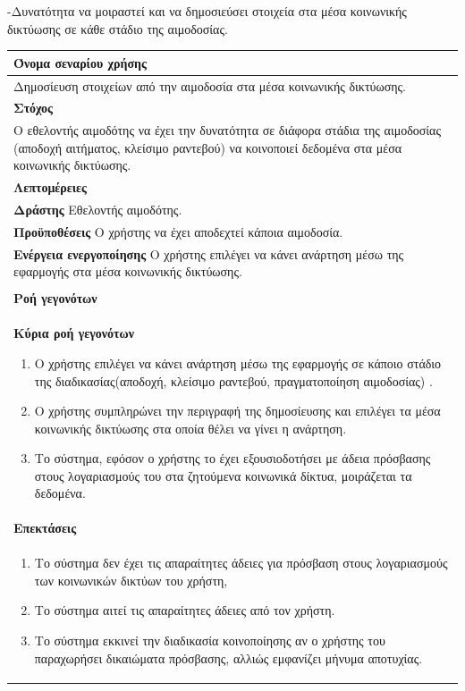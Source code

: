 -Δυνατότητα να μοιραστεί και να δημοσιεύσει στοιχεία στα μέσα κοινωνικής δικτύωσης σε κάθε στάδιο της αιμοδοσίας.

\begin{center}
    \begin{tabular}{|p{\dimexpr \linewidth-2\tabcolsep}|}
    \hline
    \rowcolor{grayy}
    \textbf{Όνομα σεναρίου χρήσης}
    \\ \hline    
    Δημοσίευση στοιχείων από την αιμοδοσία στα μέσα κοινωνικής δικτύωσης.
     \\ \hline
    \rowcolor{grayy}
    \textbf{\textbf{Στόχος}}
    \\ \hline
 	 Ο εθελοντής αιμοδότης να έχει την δυνατότητα σε διάφορα στάδια της αιμοδοσίας (αποδοχή αιτήματος, κλείσιμο ραντεβού) να κοινοποιεί δεδομένα στα μέσα κοινωνικής δικτύωσης.
    \\ \hline
    \rowcolor{grayy}
    \textbf{Λεπτομέρειες}
    \\ \hline
	\textbf{Δράστης} Εθελοντής αιμοδότης.
	\\*
	\textbf{Προϋποθέσεις} Ο χρήστης να έχει αποδεχτεί κάποια αιμοδοσία.
	\\*
	\textbf{Ενέργεια ενεργοποίησης} Ο χρήστης επιλέγει να κάνει ανάρτηση μέσω της εφαρμογής στα μέσα κοινωνικής δικτύωσης.
	\\ \hline
    \\ \hline
	\rowcolor{grayy}    
    \textbf{Ροή γεγονότων}
    \\* 
	\textbf{Κύρια ροή γεγονότων}
	\begin{enumerate}
	\item	 Ο χρήστης επιλέγει να κάνει ανάρτηση μέσω της εφαρμογής σε κάποιο στάδιο της διαδικασίας(αποδοχή, κλείσιμο ραντεβού, πραγματοποίηση αιμοδοσίας) .
	\item Ο χρήστης συμπληρώνει την περιγραφή της δημοσίευσης και επιλέγει τα μέσα κοινωνικής δικτύωσης στα οποία θέλει να γίνει η ανάρτηση.
   \item Το σύστημα, εφόσον ο χρήστης το έχει εξουσιοδοτήσει με άδεια πρόσβασης στους λογαριασμούς του στα ζητούμενα κοινωνικά δίκτυα, μοιράζεται τα δεδομένα.
	\end{enumerate}
	\\*
	\textbf{Επεκτάσεις}
	   \\ \hline
	   	   \begin{enumerate}
	\item Το σύστημα δεν έχει τις απαραίτητες άδειες για πρόσβαση στους λογαριασμούς των κοινωνικών δικτύων του χρήστη,
	\item Το σύστημα αιτεί τις απαραίτητες άδειες από τον χρήστη.
	\item Το σύστημα εκκινεί την διαδικασία κοινοποίησης αν ο χρήστης του παραχωρήσει δικαιώματα πρόσβασης, αλλιώς εμφανίζει μήνυμα αποτυχίας.
	\end{enumerate}
	\\ \hline
    \end{tabular}
\end{center}	

